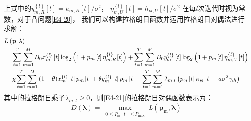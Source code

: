 上式中的$\eta_{m,R}^{\left\{ l \right\}}\left[t\right]=h_{m,R}\left[t\right]/{\sigma^2}$，
$\eta_{m,U}^{\left\{ l \right\}}\left[t\right]=h_{m,U}\left[t\right]/{\sigma^2}$
在每$l$次迭代时视为常数，对于凸问题\eqref{E4-20}，
我们可以构建拉格朗日函数并运用拉格朗日对偶法进行求解：
\begin{align} \label{E4-21}
&L\left(\mathbf{p},\lambda\right)\\
&=\sum_{t=1}^T \sum_{m=1}^M {B}_{0}x_{m}^{\left\{ l \right\}}\left[ t \right] %
\log_2{\left(1+p_m\left[t\right]\eta_{m,R}^{\left\{ l \right\}}\left[t\right]\right)}+                         \notag
\sum_{t=1}^T \sum_{m=1}^M {B}_{0}y_{m}^{\left\{ l \right\}}\left[ t \right]
\log_2{\left(1+p_m\left[t\right]\eta_{m,U}^{\left\{ l \right\}}\left[t\right]\right)}                     \\   \notag
&-\chi \sum_{t=1}^T \sum_{m=1}^M{(1-\theta)x_{m}^{\left\{ l \right\}}\left[ t \right]p_m\left[t\right]
+\theta y_{m}^{\left\{ l \right\}}\left[ t \right]p_m\left[t\right]}        %
-\sum\limits_{t=1}^{T}{\sum\limits_{m=1}^{M}{{{\lambda }_{m,t}}}}\left( {{p}_{m}}\left[ t \right]{{\kappa }_{m}}\left[ t \right]+a{{\sigma }^{2}}{{\gamma }_{th}} \right)
%
\end{align}
其中的拉格朗日乘子$\lambda_{m,t}\geq 0$，则\eqref{E4-21}的拉格朗日对偶函数表示为：
\begin{equation} \label{E4-22}
D(\mathbf{\lambda})=\max _{\substack{0 \leq P_m[t] \leq P_{\max }}} L\left(\mathbf{p_m},\mathbf{\lambda}\right)
\end{equation}
